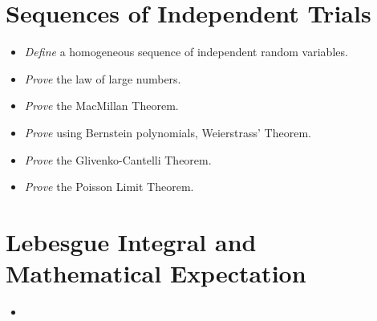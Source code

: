 \documentclass{article}
\newcommand{\cold}{{\color{babyblue}{\Snowflake}}}
\newcommand{\elegant}{{\color{brickred}{\ding{46}}}}
\newcommand{\prac}{{\color{arsenic}{\ding{43}}}}
\newcommand{\know}{{\color{arylideyellow}{\Lightning}}}
\begin{document}
\section{Sequences of Independent Trials}
\begin{itemize}[nosep]
    \item[\cold] \textit{Define} a homogeneous sequence of independent random variables. 
    \item[\cold] \textit{Prove} the law of large numbers.
    \item[\know] \textit{Prove} the MacMillan Theorem.
    \item[\elegant] \textit{Prove} using Bernstein polynomials, Weierstrass' Theorem.
    \item[\prac] \textit{Prove} the Glivenko-Cantelli Theorem.
    \item[\elegant] \textit{Prove} the Poisson Limit Theorem.
\end{itemize}
\section{Lebesgue Integral and Mathematical Expectation}
\begin{itemize}[nosep]
    \item 
\end{itemize}
\end{document}
